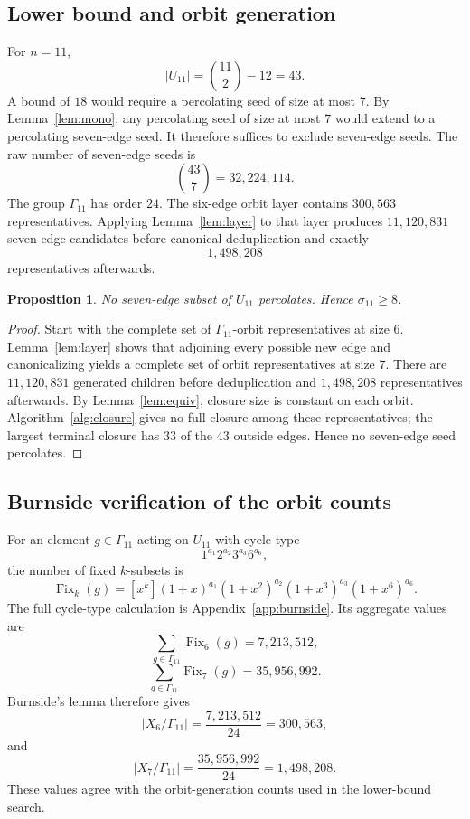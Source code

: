 \documentclass[11pt]{article}
\numberwithin{equation}{section}
\newtheorem{proposition}[theorem]{Proposition}
\begin{document}
\subsection{Lower bound and orbit generation}
For $n=11$,
\[
|U_{11}|=\binom{11}{2}-12=43.
\]
A bound of $18$ would require a percolating seed of size at most $7$. By Lemma~\ref{lem:mono}, any percolating seed of size at most $7$ would extend to a percolating seven-edge seed. It therefore suffices to exclude seven-edge seeds. The raw number of seven-edge seeds is
\[
\binom{43}{7}=32,224,114.
\]
The group $\Gamma_{11}$ has order $24$. The six-edge orbit layer contains $300,563$ representatives. Applying Lemma~\ref{lem:layer} to that layer produces $11,120,831$ seven-edge candidates before canonical deduplication and exactly
\[
1,498,208
\]
representatives afterwards.

\begin{proposition}\label{prop:n11lower}
No seven-edge subset of $U_{11}$ percolates. Hence $\sigma_{11}\ge8$.
\end{proposition}

\begin{proof}
Start with the complete set of $\Gamma_{11}$-orbit representatives at size $6$. Lemma~\ref{lem:layer} shows that adjoining every possible new edge and canonicalizing yields a complete set of orbit representatives at size $7$. There are $11,120,831$ generated children before deduplication and $1,498,208$ representatives afterwards. By Lemma~\ref{lem:equiv}, closure size is constant on each orbit. Algorithm~\ref{alg:closure} gives no full closure among these representatives; the largest terminal closure has $33$ of the $43$ outside edges. Hence no seven-edge seed percolates.
\end{proof}

\subsection{Burnside verification of the orbit counts}\label{sec:burnside}
For an element $g\in\Gamma_{11}$ acting on $U_{11}$ with cycle type
\[
1^{a_1}2^{a_2}3^{a_3}6^{a_6},
\]
the number of fixed $k$-subsets is
\[
\operatorname{Fix}_k(g)
=[x^k](1+x)^{a_1}(1+x^2)^{a_2}(1+x^3)^{a_3}(1+x^6)^{a_6}.
\tag{6.3}
\]
The full cycle-type calculation is Appendix~\ref{app:burnside}. Its aggregate values are
\[
\sum_{g\in\Gamma_{11}}\operatorname{Fix}_6(g)=7,213,512,
\]
\[
\sum_{g\in\Gamma_{11}}\operatorname{Fix}_7(g)=35,956,992.
\]
Burnside's lemma therefore gives
\[
|X_6/\Gamma_{11}|=\frac{7,213,512}{24}=300,563,
\tag{6.4}
\]
and
\[
|X_7/\Gamma_{11}|=\frac{35,956,992}{24}=1,498,208.
\tag{6.5}
\]
These values agree with the orbit-generation counts used in the lower-bound search.
\end{document}
